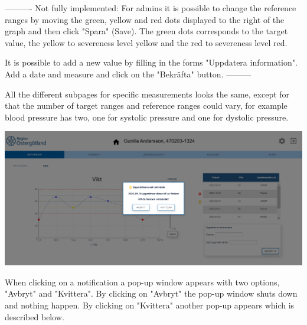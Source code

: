 ----------
\newline
Not fully implemented: 
For admins it is possible to change the reference ranges by moving the green, yellow and red dots displayed to the right of the graph and then click "Spara" (Save). The green dots corresponds to the target value, the yellow to severeness level yellow and the red to severeness level red. 

It is possible to add a new value by filling in the forms "Uppdatera information". Add a date and measure and click on the "Bekräfta" button.
\newline
---------

All the different subpages for specific measurements looks the same, except for that the number of target ranges and reference ranges could vary, for example blood pressure has two, one for systolic pressure and one for dystolic pressure.
\\

\begin{center}
    \includegraphics[width=\linewidth]{images/single_patient_weight_measurements_handle1_image.png}
    \label{fig:figures}
\end{center}
When clicking on a notification a pop-up window appears with two options, "Avbryt" and "Kvittera". By clicking on "Avbryt" the pop-up window shuts down and nothing happen. By clicking on "Kvittera" another pop-up appears which is described below.
\\

